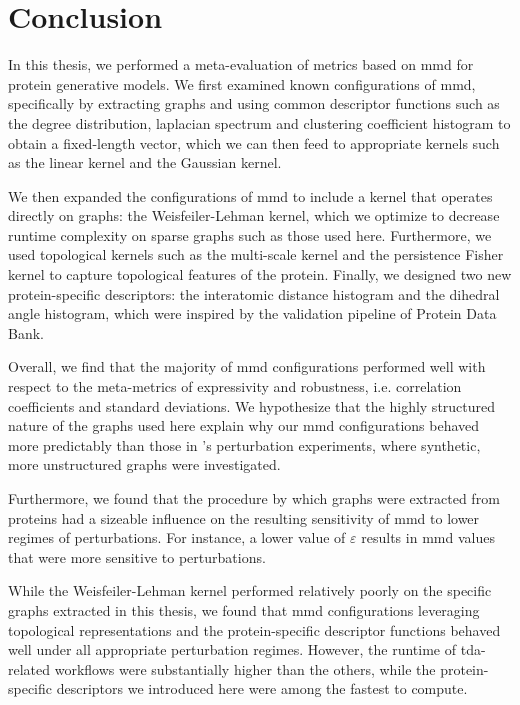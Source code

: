 \chapter{Conclusion}\label{chap:conclusion}

In this thesis, we performed a meta-evaluation of metrics based on
\gls{mmd} for protein generative models. We first examined known
configurations of \gls{mmd}, specifically by extracting graphs and using
common descriptor functions such as the degree distribution, laplacian spectrum
and clustering coefficient histogram to obtain a fixed-length vector, which we
can then feed to appropriate kernels such as the linear kernel and the Gaussian
kernel.

We then expanded the configurations of \gls{mmd} to include a kernel that operates
directly on graphs: the Weisfeiler-Lehman kernel, which we optimize to decrease
runtime complexity on sparse graphs such as those used here. Furthermore, we
used topological kernels such as the multi-scale kernel and the persistence
Fisher kernel to capture topological features of the protein. Finally, we
designed two new protein-specific descriptors: the interatomic distance
histogram and the dihedral angle histogram, which were inspired by the
validation pipeline of Protein Data Bank.

Overall, we find that the majority of \gls{mmd} configurations performed
well with respect to the meta-metrics of expressivity and robustness, i.e.
correlation coefficients and standard deviations. We hypothesize that the highly
structured nature of the graphs used here explain why our \gls{mmd}
configurations behaved more predictably than those in
\cite{obray2022evaluation}'s perturbation experiments, where synthetic, more
unstructured graphs were investigated.


Furthermore, we found that the procedure by which graphs were extracted from
proteins had a sizeable influence on the resulting sensitivity of \gls{mmd} to lower
regimes of perturbations. For instance, a lower value of $\varepsilon$ results
in \gls{mmd} values that were more sensitive to perturbations.

While the Weisfeiler-Lehman kernel performed relatively poorly on the specific
graphs extracted in this thesis, we found that \gls{mmd} configurations leveraging
topological representations and the protein-specific descriptor functions
behaved well under all appropriate perturbation regimes. However, the runtime of
\gls{tda}-related workflows were substantially higher than the others, while the
protein-specific descriptors we introduced here were among the fastest to
compute.

